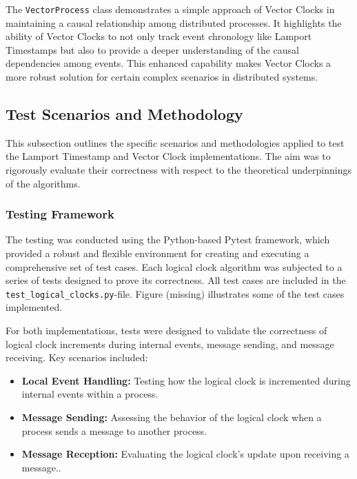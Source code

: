 \documentclass{article}
\begin{document}
      The \texttt{VectorProcess} class demonstrates a simple approach of Vector Clocks in maintaining a causal relationship among distributed processes. It highlights the ability of Vector Clocks to not only track event chronology like Lamport Timestamps but also to provide a deeper understanding of the causal dependencies among events. This enhanced capability makes Vector Clocks a more robust solution for certain complex scenarios in distributed systems.
      


    \subsection{Test Scenarios and Methodology}
      This subsection outlines the specific scenarios and methodologies applied to test the Lamport Timestamp and Vector Clock implementations. The aim was to rigorously evaluate their correctness with respect to the theoretical underpinnings of the algorithms.
      
      \subsubsection{Testing Framework}
      The testing was conducted using the Python-based Pytest framework, which provided a robust and flexible environment for creating and executing a comprehensive set of test cases. Each logical clock algorithm was subjected to a series of tests designed to prove its correctness. All test cases are included in the \texttt{test\_logical\_clocks.py}-file. Figure (missing) illustrates some of the test cases implemented.
      
      For both implementations, tests were designed to validate the correctness of logical clock increments during internal events, message sending, and message receiving. Key scenarios included:
      \begin{itemize}
          \item \textbf{Local Event Handling:} Testing how the logical clock is incremented during internal events within a process.
          \item \textbf{Message Sending:} Assessing the behavior of the logical clock when a process sends a message to another process.
          \item \textbf{Message Reception:} Evaluating the logical clock's update upon receiving a message..
      \end{itemize}
      
\end{document}
